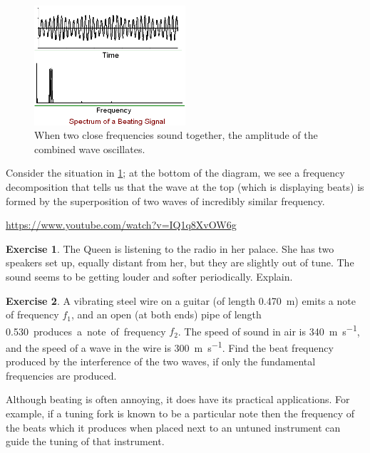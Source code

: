 \documentclass[a4paper]{amsbook}
\newcommand{\goandwatch}[1]{
\begin{center}
\begin{tcolorbox}[width=0.8\textwidth,colback={SkyBlue!20},title={\textbf{Go and watch...}},colbacktitle=MidnightBlue,coltitle=White]
  \textcolor{MidnightBlue}{\url{#1}}
\end{tcolorbox}
\end{center}}
\theoremstyle{definition}
\newtheorem{exercise}{Exercise}
\numberwithin{exercise}{chapter}
\numberwithin{exercise}{chapter}
\begin{document}
\begin{figure}
  \centering
  \includegraphics[width=0.5\textwidth]{beats}
  \caption{When two close frequencies sound together, the amplitude of the combined wave oscillates.}\label{fig:beats}
\end{figure}
Consider the situation in \cref{fig:beats}; at the bottom of the diagram, we see a frequency decomposition that tells
us that the wave at the top (which is displaying beats) is formed by the superposition of two waves of incredibly similar
frequency.

\goandwatch{https://www.youtube.com/watch?v=IQ1q8XvOW6g}

\begin{exercise}
  The Queen is listening to the radio in her palace. She has two speakers set up, equally distant from her, but they are
  slightly out of tune. The sound seems to be getting louder and softer periodically. Explain.
\end{exercise}

\begin{exercise}
  A vibrating steel wire on a guitar (of length \SI{0.470}{\metre}) emits a note of frequency $ f_1 $, and
  an open (at both ends) pipe of length \SI{0.530} produces a note of frequency $ f_2 $. The speed of sound in air
  is \SI{340}{\metre\per\second}, and the speed of a wave in the wire is \SI{300}{\metre\per\second}. Find the beat frequency
  produced by the interference of the two waves, if only the fundamental frequencies are produced.
\end{exercise}

Although beating is often annoying, it does have its practical applications. For example, if a tuning fork is known to be
a particular note then the frequency of the beats which it produces when placed next to an untuned instrument can guide
the tuning of that instrument.
\end{document}

